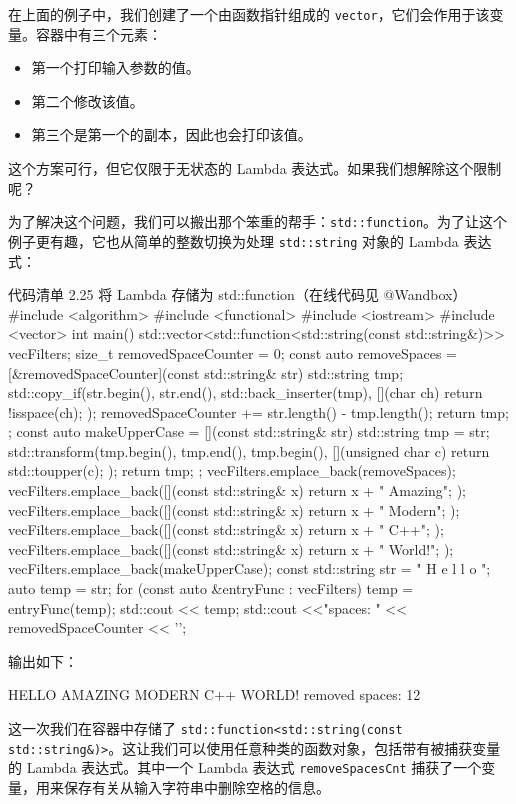 \begin{codebox}
在上面的例子中，我们创建了一个由函数指针组成的 \texttt{vector}，它们会作用于该变量。容器中有三个元素：

\begin{itemize}
\item 第一个打印输入参数的值。
\item 第二个修改该值。
\item 第三个是第一个的副本，因此也会打印该值。
\end{itemize}

这个方案可行，但它仅限于无状态的 Lambda 表达式。如果我们想解除这个限制呢？

为了解决这个问题，我们可以搬出那个笨重的帮手：\texttt{std::function}。为了让这个例子更有趣，它也从简单的整数切换为处理 \texttt{std::string} 对象的 Lambda 表达式：

\begin{codeboxt}{代码清单 2.25 将 Lambda 存储为 std::function（在线代码见 @Wandbox）}
#include <algorithm>
#include <functional>
#include <iostream>
#include <vector>
int main() {
std::vector<std::function<std::string(const std::string&)>> vecFilters;
size_t removedSpaceCounter = 0;
const auto removeSpaces = [&removedSpaceCounter](const std::string& str) {
std::string tmp;
std::copy_if(str.begin(), str.end(), std::back_inserter(tmp),
[](char ch) {return !isspace(ch); });
removedSpaceCounter += str.length() - tmp.length();
return tmp;
};
const auto makeUpperCase = [](const std::string& str) {
std::string tmp = str;
std::transform(tmp.begin(), tmp.end(), tmp.begin(),
[](unsigned char c){ return std::toupper(c); });
return tmp;
};
vecFilters.emplace_back(removeSpaces);
vecFilters.emplace_back([](const std::string& x) {
return x + " Amazing"; });
vecFilters.emplace_back([](const std::string& x) {
return x + " Modern"; });
vecFilters.emplace_back([](const std::string& x) {
return x + " C++"; });
vecFilters.emplace_back([](const std::string& x) {
return x + " World!"; });
vecFilters.emplace_back(makeUpperCase);
const std::string str = "
H e l l o
";
auto temp = str;
for (const auto &entryFunc : vecFilters)
temp = entryFunc(temp);
std::cout << temp;
std::cout <<"\nremoved spaces: " << removedSpaceCounter << '\n';
}
\end{codeboxt}

输出如下：

\begin{codebox}
HELLO AMAZING MODERN C++ WORLD!
removed spaces: 12
\end{codebox}

这一次我们在容器中存储了 \texttt{std::function<std::string(const std::string\&)>}。这让我们可以使用任意种类的函数对象，包括带有被捕获变量的 Lambda 表达式。其中一个 Lambda 表达式 \texttt{removeSpacesCnt} 捕获了一个变量，用来保存有关从输入字符串中删除空格的信息。


\end{codebox}
